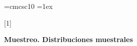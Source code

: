 \documentclass[12pt]{article}\usepackage[]{graphicx}\usepackage[]{color}
\begin{document}
\font\sc=cmcsc10
\parskip=1ex
{}
\setcounter{problemes}{0}


\newenvironment{prob}{\vskip 0.25cm\addtocounter{problemes}{1}
\noindent{\textbf{\theproblemes.- }}}


\newcommand{\sol}[1]{{\textbf{ }}}

\newcommand{\probl}{\vskip 0.25cm\addtocounter{problemes}{1}
\noindent{\textbf{\theproblemes.- }}}









\textbf{Muestreo. Distribuciones muestrales}
\end{document}
